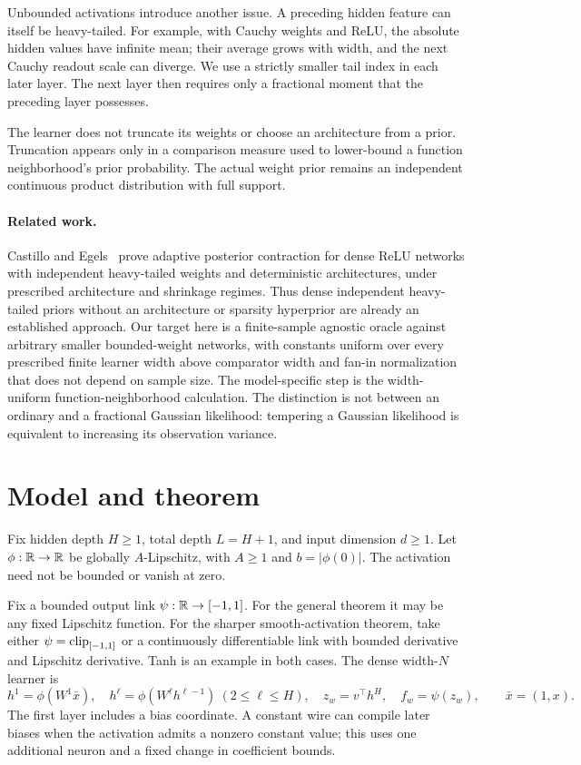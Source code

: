 \documentclass[11pt]{article}
\theoremstyle{remark}\newtheorem{remark}[theorem]{Remark}
\begin{document}
Unbounded activations introduce another issue. A preceding hidden feature can itself be heavy-tailed. For example, with Cauchy weights and ReLU, the absolute hidden values have infinite mean; their average grows with width, and the next Cauchy readout scale can diverge. We use a strictly smaller tail index in each later layer. The next layer then requires only a fractional moment that the preceding layer possesses.

The learner does not truncate its weights or choose an architecture from a prior. Truncation appears only in a comparison measure used to lower-bound a function neighborhood's prior probability. The actual weight prior remains an independent continuous product distribution with full support.

\paragraph{Related work.}
Castillo and Egels~\cite{castillo-egels} prove adaptive posterior contraction for dense ReLU networks with independent heavy-tailed weights and deterministic architectures, under prescribed architecture and shrinkage regimes. Thus dense independent heavy-tailed priors without an architecture or sparsity hyperprior are already an established approach. Our target here is a finite-sample agnostic oracle against arbitrary smaller bounded-weight networks, with constants uniform over every prescribed finite learner width above comparator width and fan-in normalization that does not depend on sample size. The model-specific step is the width-uniform function-neighborhood calculation. The distinction is not between an ordinary and a fractional Gaussian likelihood: tempering a Gaussian likelihood is equivalent to increasing its observation variance.

\section{Model and theorem}
Fix hidden depth $H\ge1$, total depth $L=H+1$, and input dimension $d\ge1$. Let $\phi:\mathbb R\to\mathbb R$ be globally $A$-Lipschitz, with $A\ge1$ and $b=|\phi(0)|$. The activation need not be bounded or vanish at zero.

Fix a bounded output link $\psi:\mathbb R\to[-1,1]$. For the general theorem it may be any fixed Lipschitz function. For the sharper smooth-activation theorem, take either $\psi=\operatorname{clip}_{[-1,1]}$ or a continuously differentiable link with bounded derivative and Lipschitz derivative. Tanh is an example in both cases. The dense width-$N$ learner is
\begin{equation}
 h^1=\phi(W^1\bar x),\quad
 h^\ell=\phi(W^\ell h^{\ell-1})\ (2\le\ell\le H),\quad
 z_w=v^\top h^H,\quad f_w=\psi(z_w),\qquad \bar x=(1,x).
 \label{eq:network}
\end{equation}
The first layer includes a bias coordinate. A constant wire can compile later biases when the activation admits a nonzero constant value; this uses one additional neuron and a fixed change in coefficient bounds.
\end{document}
